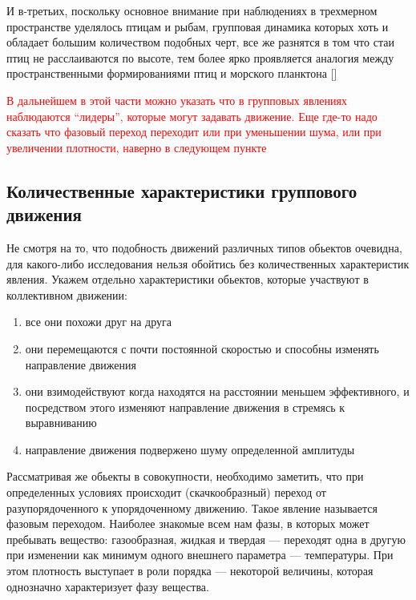 	\marginpar{}
    И в-третьих, поскольку основное внимание при наблюдениях в трехмерном пространстве уделялось птицам и рыбам, групповая динамика которых хоть и обладает большим количеством подобных черт, все же разнятся в том что стаи птиц не расслаиваются по высоте, тем более ярко проявляется аналогия между пространственными формированиями птиц и морского планктона []
	
    \textcolor{red}{В дальнейшем в этой части можно указать что в групповых явлениях наблюдаются ``лидеры'', которые могут задавать движение. Еще где-то надо сказать что фазовый переход переходит или при уменьшении шума, или при увеличении плотности, наверно в следующем пункте}


    \subsection{Количественные характеристики группового движения} %
    \label{sub:NumCharCollMot}
    Не смотря на то, что подобность движений различных типов обьектов очевидна, для какого-либо исследования нельзя обойтись без количественных характеристик явления.
    Укажем отдельно характеристики обьектов, которые участвуют в коллективном движении:
    \begin{enumerate}
        \item все они похожи друг на друга
        \item они перемещаются с почти постоянной скоростью и способны изменять направление движения
        \item они взимодействуют когда находятся на расстоянии меньшем эффективного, и посредством этого изменяют направление движения в стремясь к выравниванию
        \item направление движения подвержено шуму определенной амплитуды
    \end{enumerate}

    Рассматривая же обьекты в совокупности, необходимо заметить, что при определенных условиях происходит (скачкообразный) переход от разупорядоченного к упорядоченному движению. Такое явление называется фазовым переходом. Наиболее знакомые всем нам фазы, в которых может пребывать вещество: газообразная, жидкая и твердая --- переходят одна в другую при изменении как минимум одного внешнего параметра --- температуры. При этом плотность выступает в роли { порядка} --- некоторой величины, которая однозначно характеризует фазу вещества.

